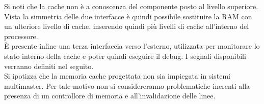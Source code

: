 Si noti che la cache non \`e a conoscenza del componente posto al livello superiore. Vista la simmetria delle due interfacce \`e quindi possibile sostituire la RAM con un ulteriore livello di cache. inserendo quindi pi\`u livelli di cache all'interno del processore.\\
\`E presente infine una terza interfaccia verso l'esterno, utilizzata per monitorare lo stato interno della cache e poter quindi eseguire il debug.
I segnali disponibili verranno definiti nel seguito.\\
Si ipotizza che la memoria cache progettata non sia impiegata in sistemi multimaster. Per tale motivo non si considereranno problematiche inerenti alla presenza di un controllore di memoria e all'invalidazione delle linee.










